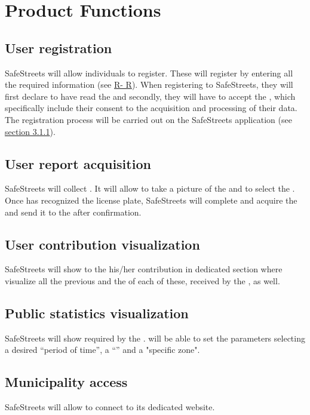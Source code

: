 \documentclass[../../rasd.tex]{subfiles}
\begin{document}
	
	\section{Product Functions}
	
	\subsection{User registration}
	SafeStreets will allow individuals to register. These will register by entering all the required information (see \hyperref[sect:3.2.5]{R- R}). When registering to SafeStreets, they will first declare to have read the  and secondly, they will have to accept the , which specifically include their consent to the acquisition and processing of their data. \\
	The  registration process will be carried out on the SafeStreets application (see \hyperref[sect:3.1.1]{section 3.1.1}). 
	
	\subsection{User report acquisition}
	SafeStreets will collect . It will allow  to take a picture of the  and to select the . Once  has recognized the license plate, SafeStreets will complete and acquire the  and send it to the  after  confirmation. 
	
	\subsection{User contribution visualization}
	SafeStreets will show to the  his/her contribution in dedicated section where visualize all the previous  and the  of each of these, received by the , as well.
	
	\subsection{Public statistics visualization}
	SafeStreets will show  required by the .  will be able to set the parameters selecting a desired “period of time”, a “” and a "specific zone". 
	
	\subsection{Municipality access}
	SafeStreets will allow  to connect to its dedicated website.  
	
\end{document}
